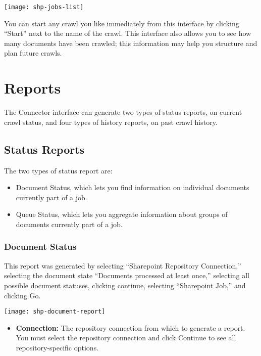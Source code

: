 \begin{changemargin}{1.5in}{0in}
\texttt{[image: shp-jobs-list]}

You can start any crawl you like immediately from this interface by
clicking ``Start'' next to the name of the crawl. This interface also
allows you to see how many documents have been crawled; this information
may help you structure and plan future crawls.


\section{Reports}

The Connector interface can generate two types of status reports, on
current crawl status, and four types of history reports, on past crawl
history.

\subsection{Status Reports}

The two types of status report are:

\begin{itemize}

\item Document Status, which lets you find information on individual
documents currently part of a job.

\item Queue Status, which lets you aggregate information about groups
of documents currently part of a job.

\end{itemize}

\subsubsection{Document Status}

This report was generated by selecting ``Sharepoint Repository
Connection,'' selecting the document state ``Documents processed at
least once,'' selecting all possible document statuses, clicking
continue, selecting ``Sharepoint Job,'' and clicking Go.

\texttt{[image: shp-document-report]}

\begin{itemize}

\item \textbf{Connection:} The repository connection from which to 
generate a report. You must select the repository connection and click
Continue to see all repository-specific options. %


\end{itemize}
\end{changemargin}
